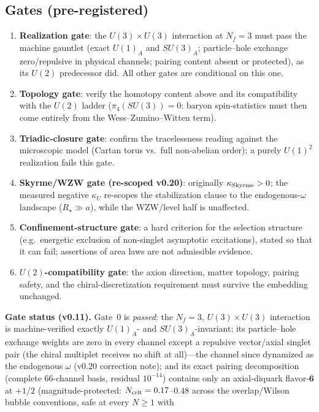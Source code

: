 \documentclass[11pt,a4paper]{article}
\begin{document}
\subsection*{Gates (pre-registered)}
\begin{enumerate}
\item[0.] \textbf{Realization gate}: the
$U(3)\times U(3)$ interaction at $N_f = 3$ must pass the machine
gauntlet (exact $U(1)_A$ and $SU(3)_A$; particle--hole exchange
zero/repulsive in physical channels; pairing content
absent or protected), as its $U(2)$ predecessor did.  All other
gates are conditional on this one.
\item[1.] \textbf{Topology gate}: verify the homotopy content
above and its compatibility with the $U(2)$ ladder
($\pi_4(SU(3)) = 0$: baryon spin-statistics must then come
entirely from the Wess--Zumino--Witten term).
\item[2.] \textbf{Triadic-closure gate}: confirm the
tracelessness reading against the microscopic model (Cartan
torus vs.\ full non-abelian order); a purely $U(1)^2$ realization
fails this gate.
\item[3.] \textbf{Skyrme/WZW gate (re-scoped v0.20)}: originally
$\kappa_{\rm Skyrme} > 0$; the measured negative $\kappa_U$
re-scopes the stabilization clause to the endogenous-$\omega$
landscape ($R_\star \gg a$), while the WZW/level half is
unaffected.
\item[4.] \textbf{Confinement-structure gate}: a hard criterion
for the selection structure (e.g.\ energetic exclusion of
non-singlet asymptotic excitations), stated so that it can fail;
assertions of area laws are not admissible evidence.
\item[5.] \textbf{$U(2)$-compatibility gate}: the axion
direction, matter topology, pairing safety, and the
chiral-discretization requirement must survive the embedding
unchanged.
\end{enumerate}
\textbf{Gate status (v0.11).}  Gate~0 is \emph{passed}: the
$N_f = 3$, $U(3)\times U(3)$ interaction is machine-verified
exactly $U(1)_A$- and $SU(3)_A$-invariant; its particle--hole
exchange weights are zero in every channel except a repulsive
vector/axial singlet pair (the chiral multiplet receives no shift
at all)---the channel since dynamized as the endogenous
$\omega$ (v0.20 correction note); and its exact pairing decomposition (complete
$66$-channel basis, residual $10^{-14}$) contains only an
axial-diquark flavor-$\mathbf{6}$ at $+1/2$
(magnitude-protected: $N_{\rm crit} = 0.17$--$0.48$ across the
overlap/Wilson bubble conventions, safe at every $N \geq 1$ with
\end{document}
